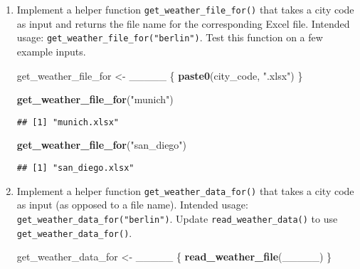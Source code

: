 \documentclass[]{book}
\newenvironment{Shaded}{\begin{snugshade}}{\end{snugshade}}
\newcommand{\KeywordTok}[1]{\textcolor[rgb]{0.13,0.29,0.53}{\textbf{#1}}}
\newcommand{\NormalTok}[1]{#1}
\newcommand{\StringTok}[1]{\textcolor[rgb]{0.31,0.60,0.02}{#1}}
\begin{document}
\begin{enumerate}
\def\labelenumi{\arabic{enumi}.}
\item
  Implement a helper function \texttt{get\_weather\_file\_for()} that takes a city code as input and returns the file name for the corresponding Excel file. Intended usage: \texttt{get\_weather\_file\_for("berlin")}. Test this function on a few example inputs.

\begin{Shaded}
\begin{Highlighting}[]
\NormalTok{get_weather_file_for <-}\StringTok{ }\NormalTok{_____ \{}
  \KeywordTok{paste0}\NormalTok{(city_code, }\StringTok{".xlsx"}\NormalTok{)}
\NormalTok{\}}
\end{Highlighting}
\end{Shaded}

\begin{Shaded}
\begin{Highlighting}[]
\KeywordTok{get_weather_file_for}\NormalTok{(}\StringTok{"munich"}\NormalTok{)}
\end{Highlighting}
\end{Shaded}

\begin{verbatim}
## [1] "munich.xlsx"
\end{verbatim}

\begin{Shaded}
\begin{Highlighting}[]
\KeywordTok{get_weather_file_for}\NormalTok{(}\StringTok{"san_diego"}\NormalTok{)}
\end{Highlighting}
\end{Shaded}

\begin{verbatim}
## [1] "san_diego.xlsx"
\end{verbatim}
\item
  Implement a helper function \texttt{get\_weather\_data\_for()} that takes a city code as input (as opposed to a file name). Intended usage: \texttt{get\_weather\_data\_for("berlin")}. Update \texttt{read\_weather\_data()} to use \texttt{get\_weather\_data\_for()}.

\begin{Shaded}
\begin{Highlighting}[]
\NormalTok{get_weather_data_for <-}\StringTok{ }\NormalTok{_____ \{}
  \KeywordTok{read_weather_file}\NormalTok{(_____)}
\NormalTok{\}}
\end{Highlighting}
\end{Shaded}


\end{enumerate}
\end{document}
